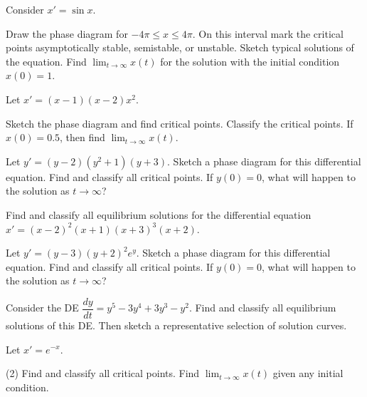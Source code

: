 \begin{exercise}
Consider $x' = \sin x$.
\begin{tasks}
\task Draw the phase diagram for $-4\pi \leq x \leq 4\pi$.  On this interval
mark the critical points asymptotically stable, semistable, or unstable.
\task Sketch typical solutions of the equation.
\task Find $\displaystyle \lim_{t\to \infty} x(t)$ for the solution with the initial condition
$x(0) = 1$.
\end{tasks}
\end{exercise}

\begin{exercise}\ansMark%
Let $x'=(x-1)(x-2)x^2$.
\begin{tasks}
\task Sketch the phase diagram and find critical
points.
\task Classify the critical points.
\task If $x(0)=0.5$, then find $\displaystyle \lim_{t\to\infty} x(t)$.
\end{tasks}
\end{exercise}

\begin{exercise}
Let $y' = (y-2)(y^2 + 1)(y+3)$. Sketch a phase diagram for this differential equation. Find and classify all critical points. If $y(0) = 0$, what will happen to the solution as $t \rightarrow \infty$?
\end{exercise}

\begin{exercise}
Find and classify all equilibrium solutions for the differential equation $x' = (x-2)^2(x+1)(x+3)^3(x+2)$.
\end{exercise}

\begin{exercise}
Let $y' = (y-3)(y+2)^2e^y$. Sketch a phase diagram for this differential equation. Find and classify all critical points. If $y(0) = 0$, what will happen to the solution as $t \rightarrow \infty$?
\end{exercise}

\begin{exercise}
Consider the DE $\dfrac{dy}{dt}=y^5-3y^4+3y^3-y^2$. %
Find and classify all equilibrium solutions of this DE. Then sketch a representative selection of solution curves.
\end{exercise}

\begin{exercise}\ansMark%
Let $x'=e^{-x}$.
\begin{tasks}(2)
\task Find and classify all critical points.
\task Find $\displaystyle \lim_{t\to\infty} x(t)$ given any 
initial condition.
\end{tasks}
\end{exercise}


